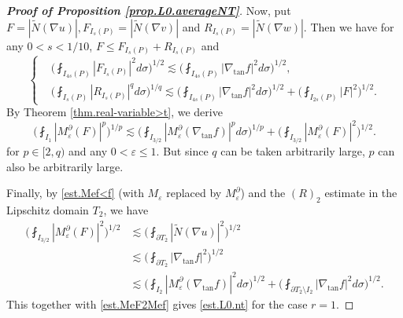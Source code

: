 \documentclass[reqno,12pt]{amsart} %
\theoremstyle{definition}
\theoremstyle{remark}
\numberwithin{equation}{section}
\newcommand{\e}{\varepsilon}
\begin{document}
\begin{proof}[\textbf{Proof of Proposition \ref{prop.L0.averageNT}}]
    Now, put $F = |\widetilde{N}(\nabla u)|, F_{I_{s}(P)} = |\widetilde{N}(\nabla v)|$ and $R_{I_s(P)} = |\widetilde{N}(\nabla w)|$. Then we have for any $0 < s < 1/10$, $F \le F_{I_{s}(P)} + R_{I_s(P)}$ and
    \begin{equation}
        \left\{ 
        \begin{aligned}
            & \bigg( \fint_{I_{4s}(P)} |F_{I_{s}(P)}|^2 d\sigma \bigg)^{1/2} \lesssim \bigg( \fint_{I_{4s}(P)} |\nabla_{\tan} f|^2 d\sigma \bigg)^{1/2},\\
            & \bigg( \fint_{I_{s}(P)} |R_{I_s(P)}|^q d\sigma \bigg)^{1/q} \lesssim \bigg( \fint_{I_{4s}(P)} |\nabla_{\tan} f|^2 d\sigma \bigg)^{1/2} + \bigg( \fint_{I_{2s}(P)} |F|^2 \bigg)^{1/2}.
        \end{aligned}
        \right.
    \end{equation}
    By Theorem \ref{thm.real-variable>t}, we derive
    \begin{equation}\label{est.MeF2Mef}
        \bigg( \fint_{I_1} |M_\e^\partial (F)|^p \bigg)^{1/p} \lesssim \bigg( \fint_{I_{3/2}} |M_\e^\partial (\nabla_{\tan} f)|^p d\sigma \bigg)^{1/p} + \bigg( \fint_{I_{3/2}} |M_\e^\partial (F)|^2 \bigg)^{1/2}.
    \end{equation}
    for $p\in [2,q)$ and any $0<\e \le 1$. But since $q$ can be taken arbitrarily large, $p$ can also be arbitrarily large. 

    Finally, by \eqref{est.Mef<f} (with $M_\e$ replaced by $M_\e^\partial$) and the $(R)_2$ estimate in the Lipschitz domain $T_2$, we have
    \begin{equation}
    \begin{aligned}
        \bigg( \fint_{I_{3/2}} |M_\e^\partial (F)|^2 \bigg)^{1/2} & \lesssim \bigg( \fint_{\partial T_2} |\widetilde{N}(\nabla u)|^2 \bigg)^{1/2} \\
        & \lesssim \bigg( \fint_{\partial T_2} |\nabla_{\tan} f|^2 \bigg)^{1/2} \\
        & \lesssim \bigg( \fint_{I_{2}} |M_\e^\partial(\nabla_{\tan} f)|^2 d\sigma \bigg)^{1/2} + \bigg( \fint_{\partial T_{2} \setminus I_{2} } |\nabla_{\tan} f|^2 d\sigma \bigg)^{1/2}.
    \end{aligned}  
    \end{equation}
    This together with \eqref{est.MeF2Mef} gives \eqref{est.L0.nt} for the case $r = 1$.
\end{proof}
\end{document}
